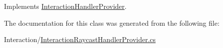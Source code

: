 Implements \mbox{\hyperlink{class_interaction_handler_provider_a7cd6cb9b81f1504895f121bf0f7d1d97}{Interaction\+Handler\+Provider}}.



The documentation for this class was generated from the following file\+:\begin{DoxyCompactItemize}
\item 
Interaction/\mbox{\hyperlink{_interaction_raycast_handler_provider_8cs}{Interaction\+Raycast\+Handler\+Provider.\+cs}}\end{DoxyCompactItemize}
